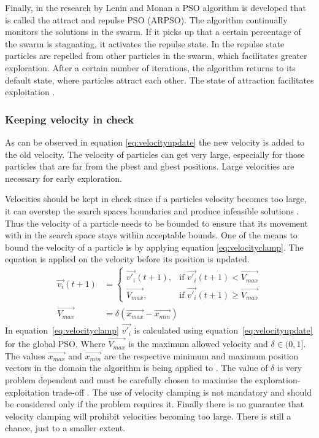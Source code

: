 Finally, in the research by Lenin and Monan a PSO algorithm is developed that is called the attract and repulse PSO (ARPSO). The algorithm continually monitors the solutions in the swarm. If it picks up that a certain percentage of the swarm is stagnating, it activates the repulse state. In the repulse state particles are repelled from other particles in the swarm, which facilitates greater exploration. After a certain number of iterations, the algorithm returns to its default state, where particles attract each other. The state of attraction facilitates exploitation \cite{PSOAttractRepulse}.
\subsubsection{Keeping velocity in check}
As can be observed in equation \ref{eq:velocityupdate} the new velocity is added to the old velocity. The velocity of particles can get very large, especially for those particles that are far from the pbest and gbest positions. Large velocities are necessary for early exploration. 

Velocities should be kept in check since if a particles velocity becomes too large, it can overstep the search spaces boundaries and produce infeasible solutions \cite{FundamentalSwarm}. Thus the velocity of a particle needs to be bounded to ensure that its movement with in the search space stays within acceptable bounds. One of the means to bound the velocity of a particle is by applying equation \ref{eq:velocityclamp}. The equation is applied on the velocity before its position is updated\cite{FundamentalSwarm}.
\begin{align}
	\vec{v_i}(t+1) &=
	\begin{cases}
	\vec{v'_i}(t+1), &\text{if $\vec{v'_i}(t+1) < \vec{V_{max}}$}\\
	\vec{V_{max}}, &\text{if $\vec{v'_i}(t+1) \geq \vec{V_{max}}$}
	\end{cases} \label{eq:velocityclamp}\\
	\vec{V_{max}} &= \delta(\vec{x_{max}} - \vec{x_{min}})
\end{align}
In equation~\ref{eq:velocityclamp} $\vec{v'_i}$ is calculated using equation~\ref{eq:velocityupdate} for the global PSO. Where $\vec{V_{max}}$ is the maximum allowed velocity and $\delta \in (0,1]$. The values $\vec{x_{max}}$ and $\vec{x_{min}}$ are the respective minimum and maximum position vectors in the domain the algorithm is being applied to \cite{FundamentalSwarm}. The value of $\delta$ is very problem dependent and must be carefully chosen to maximise the exploration-exploitation trade-off \cite{FundamentalSwarm}. The use of velocity clamping is not mandatory and should be considered only if the problem requires it\cite{FundamentalSwarm}. Finally there is no guarantee that velocity clamping will prohibit velocities becoming too large\cite{FundamentalSwarm}. There is still a chance, just to a smaller extent\cite{FundamentalSwarm}.

